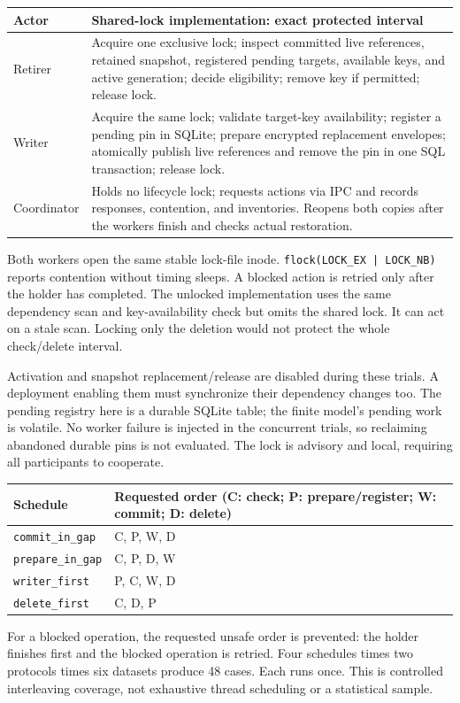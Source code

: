 \documentclass[10pt]{article}
\begin{document}
\begin{center}\begin{tabular}{@{}p{2.3cm}p{12.9cm}@{}}
\toprule
Actor & Shared-lock implementation: exact protected interval\\
\midrule
Retirer & Acquire one exclusive lock; inspect committed live references, retained snapshot, registered pending targets, available keys, and active generation; decide eligibility; remove key if permitted; release lock.\\
Writer & Acquire the same lock; validate target-key availability; register a pending pin in SQLite; prepare encrypted replacement envelopes; atomically publish live references and remove the pin in one SQL transaction; release lock.\\
Coordinator & Holds no lifecycle lock; requests actions via IPC and records responses, contention, and inventories. Reopens both copies after the workers finish and checks actual restoration.\\
\bottomrule\end{tabular}\end{center}
Both workers open the same stable lock-file inode. \texttt{flock(LOCK\_EX | LOCK\_NB)}
reports contention without timing sleeps. A blocked action is retried only after
the holder has completed. The unlocked implementation uses the same dependency
scan and key-availability check but omits the shared lock. It can act on a stale
scan. Locking only the deletion would not protect the whole check/delete interval.

Activation and snapshot replacement/release are disabled during these trials.
A deployment enabling them must synchronize their dependency changes too.
The pending registry here is a durable SQLite table; the finite model's pending
work is volatile. No worker failure is injected in the concurrent trials, so
reclaiming abandoned durable pins is not evaluated. The lock is advisory and
local, requiring all participants to cooperate.

\begin{center}\begin{tabular}{@{}lp{9.4cm}@{}}
\toprule
Schedule & Requested order (C: check; P: prepare/register; W: commit; D: delete)\\
\midrule
\texttt{commit\_in\_gap} & C, P, W, D\\
\texttt{prepare\_in\_gap} & C, P, D, W\\
\texttt{writer\_first} & P, C, W, D\\
\texttt{delete\_first} & C, D, P\\
\bottomrule\end{tabular}\end{center}
For a blocked operation, the requested unsafe order is prevented: the holder
finishes first and the blocked operation is retried. Four schedules times two
protocols times six datasets produce 48 cases. Each runs once. This is controlled
interleaving coverage, not exhaustive thread scheduling or a statistical sample.
\end{document}
